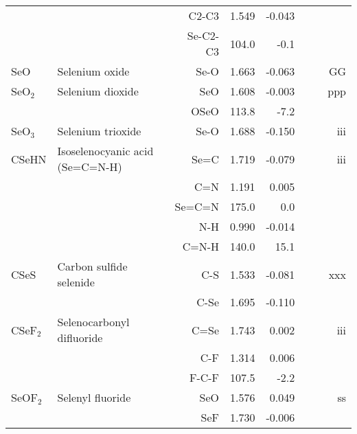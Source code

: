 \begin{table}
\begin{center}
\begin{tabular}{llrrrrrr}
             &                                    &C2-C3          &     1.549   &    -0.043 &  &  &       \\
             &                                    &Se-C2-C3     &     104.0   &      -0.1 &  &    &       \\
 SeO         & Selenium oxide                     &Se-O           &     1.663   &    -0.063 &  &  &    GG \\
 SeO$_2$        & Selenium dioxide                   &SeO            &     1.608   &    -0.003 &  &  &   ppp \\
             &                                    &OSeO         &     113.8   &      -7.2 &  &    &       \\
 SeO$_3$        & Selenium trioxide                  &Se-O           &     1.688   &    -0.150 &  &  &   iii \\
 CSeHN       & Isoselenocyanic acid (Se=C=N-H)    &Se=C           &     1.719   &    -0.079 &  &  &   iii \\
             &                                    &C=N            &     1.191   &     0.005 &  &  &       \\
             &                                    &Se=C=N       &     175.0   &       0.0 &  &    &       \\
             &                                    &N-H            &     0.990   &    -0.014 &  &  &       \\
             &                                    &C=N-H        &     140.0   &      15.1 &  &    &       \\
 CSeS        & Carbon sulfide selenide            &C-S            &     1.533   &    -0.081 &  &  &   xxx \\
             &                                    &C-Se           &     1.695   &    -0.110 &  &  &       \\
 CSeF$_2$       & Selenocarbonyl difluoride          &C=Se           &     1.743   &     0.002 &  &  &   iii \\
             &                                    &C-F            &     1.314   &     0.006 &  &  &       \\
             &                                    &F-C-F        &     107.5   &      -2.2 &  &    &       \\
 SeOF$_2$       & Selenyl fluoride                   &SeO            &     1.576   &     0.049 &  &  &    ss \\
             &                                    &SeF            &     1.730   &    -0.006 &  &  &       \\

\end{tabular}
\end{center}
\end{table}

